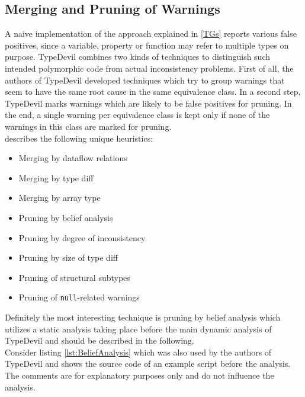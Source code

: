 \documentclass[runningheads,a4paper]{llncs}
\begin{document}
\newpage
\subsection{Merging and Pruning of Warnings}

A naive implementation of the approach explained in \ref{TGs} reports various false positives, since a variable, property or function may refer to multiple types on purpose. 
TypeDevil combines two kinds of techniques to distinguish such intended polymorphic code from actual inconsistency problems. 
First of all, the authors of TypeDevil developed techniques which try to group warnings that seem to have the same root cause in the same equivalence class.
In a second step, TypeDevil marks warnings which are likely to be false positives for pruning.
In the end, a single warning per equivalence class is kept only if none of the warnings in this class are marked for pruning.\\
\cite{DBLP:conf/icse/PradelSS15} describes the following unique heuristics:
\begin{itemize}
    \item Merging by dataflow relations
    \item Merging by type diff
    \item Merging by array type
    \item Pruning by belief analysis
    \item Pruning by degree of inconsistency
    \item Pruning by size of type diff
    \item Pruning of structural subtypes
    \item Pruning of \lstinline[columns=fixed]{null}-related warnings
  \end{itemize}
Definitely the most interesting technique is pruning by belief analysis which utilizes a static analysis taking place before the main dynamic analysis of TypeDevil and should be described in the following.\\
Consider listing \ref{lst:BeliefAnalysis} which was also used by the authors of TypeDevil \cite{DBLP:conf/icse/PradelSS15} and shows the source code of an example script before the analysis. The comments are for explanatory purposes only and do not influence the analysis.
\end{document}
